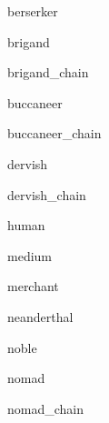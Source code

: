 \documentclass[letterpaper,serif]{module}
\begin{document}
\begin{newmonster}{berserker}\end{newmonster}

\begin{newmonster}{brigand}\end{newmonster}

\begin{newmonster}{brigand_chain}\end{newmonster}

\begin{newmonster}{buccaneer}\end{newmonster}

\begin{newmonster}{buccaneer_chain}\end{newmonster}

\begin{newmonster}{dervish}\end{newmonster}

\begin{newmonster}{dervish_chain}\end{newmonster}

\begin{newmonster}{human}\end{newmonster}

\begin{newmonster}{medium}\end{newmonster}

\begin{newmonster}{merchant}\end{newmonster}

\begin{newmonster}{neanderthal}\end{newmonster}

\begin{newmonster}{noble}\end{newmonster}

\begin{newmonster}{nomad}\end{newmonster}

\begin{newmonster}{nomad_chain}\end{newmonster}
\end{document}
